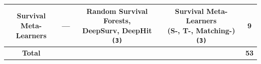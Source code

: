 \begin{table}[htbp]
{\begin{adjustbox}{max width = 0.85\textwidth}
\begin{tabular}{ccccc}
    \midrule

    \makecell[c]{Survival \\ Meta-Learners} 
    & --- 
    & \makecell[c]{Random Survival Forests,\\DeepSurv, DeepHit\\\texttt{(3)}} 
    & \makecell[c]{Survival Meta-Learners\\ (S-, T-, Matching-)\\\texttt{(3)}} 
    & \textbf{9} \\

    \midrule

    \textbf{Total} 
    & 
    & 
    & 
    & \textbf{53} \\

    \bottomrule
  \end{tabular}
  \end{adjustbox}
}
\end{table}